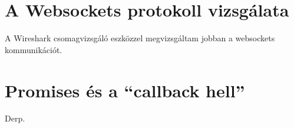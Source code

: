 




\section{A Websockets protokoll vizsgálata}

A Wireshark csomagvizsgáló eszközzel megvizsgáltam jobban a websockets kommunikációt.  




\section{Promises és a ``callback hell''}
Derp.


